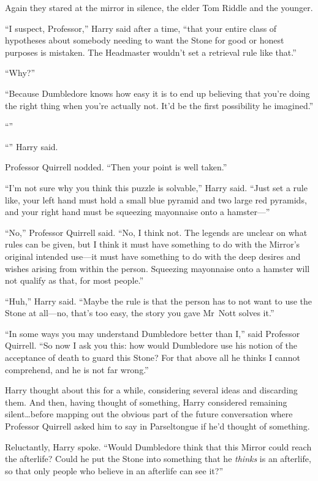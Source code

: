 Again they stared at the mirror in silence, the elder Tom Riddle and the younger.

“I suspect, Professor,” Harry said after a time, “that your entire class of hypotheses about somebody needing to want the Stone for good or honest purposes is mistaken. The Headmaster wouldn’t set a retrieval rule like that.”

“Why?”

“Because Dumbledore knows how easy it is to end up believing that you’re doing the right thing when you’re actually not. It’d be the first possibility he imagined.”

“”

“” Harry said.

Professor Quirrell nodded. “Then your point is well taken.”

“I’m not sure why you think this puzzle is solvable,” Harry said. “Just set a rule like, your left hand must hold a small blue pyramid and two large red pyramids, and your right hand must be squeezing mayonnaise onto a hamster—”

“No,” Professor Quirrell said. “No, I think not. The legends are unclear on what rules can be given, but I think it must have something to do with the Mirror’s original intended use—it must have something to do with the deep desires and wishes arising from within the person. Squeezing mayonnaise onto a hamster will not qualify as that, for most people.”

“Huh,” Harry said. “Maybe the rule is that the person has to not want to use the Stone at all—no, that’s too easy, the story you gave Mr~Nott solves it.”

“In some ways you may understand Dumbledore better than I,” said Professor Quirrell. “So now I ask you this: how would Dumbledore use his notion of the acceptance of death to guard this Stone? For that above all he thinks I cannot comprehend, and he is not far wrong.”

Harry thought about this for a while, considering several ideas and discarding them. And then, having thought of something, Harry considered remaining silent…before mapping out the obvious part of the future conversation where Professor Quirrell asked him to say in Parseltongue if he’d thought of something.

Reluctantly, Harry spoke. “Would Dumbledore think that this Mirror could reach the afterlife? Could he put the Stone into something that he \emph{thinks} is an afterlife, so that only people who believe in an afterlife can see it?”

